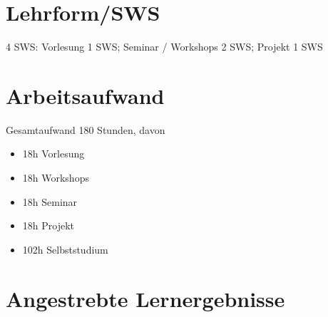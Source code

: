 \section*{Lehrform/SWS\label{/mi-2017/modulbeschreibungen-master/MA_VC_Modul_Visualisierung}}\label{lehrformswspathlabelmi-2017modulbeschreibungen-mastermaux5fvcux5fmodulux5fvisualisierung}

4 SWS: Vorlesung 1 SWS; Seminar / Workshops 2 SWS; Projekt 1 SWS

\section*{Arbeitsaufwand\label{/mi-2017/modulbeschreibungen-master/MA_VC_Modul_Visualisierung}}\label{arbeitsaufwandpathlabelmi-2017modulbeschreibungen-mastermaux5fvcux5fmodulux5fvisualisierung}

Gesamtaufwand 180 Stunden, davon

\begin{itemize}
\tightlist
\item
  18h Vorlesung
\item
  18h Workshops
\item
  18h Seminar
\item
  18h Projekt
\item
  102h Selbststudium
\end{itemize}

\section*{Angestrebte
Lernergebnisse\label{/mi-2017/modulbeschreibungen-master/MA_VC_Modul_Visualisierung}}\label{angestrebte-lernergebnissepathlabelmi-2017modulbeschreibungen-mastermaux5fvcux5fmodulux5fvisualisierung}

